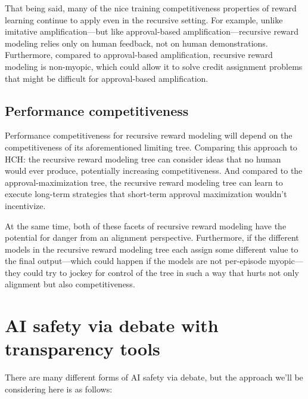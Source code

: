 \documentclass[
  onecolumn,
  natbib,
]{miri-tech-article}
\begin{document}
That being said, many of the nice training competitiveness properties of reward learning continue to apply even in the recursive setting. For example, unlike imitative amplification---but like approval-based amplification---recursive reward modeling relies only on human feedback, not on human demonstrations. Furthermore, compared to approval-based amplification, recursive reward modeling is non-myopic, which could allow it to solve credit assignment problems that might be difficult for approval-based amplification.

\subsection{Performance competitiveness} Performance competitiveness for recursive reward modeling will depend on the competitiveness of its aforementioned limiting tree. Comparing this approach to HCH: the recursive reward modeling tree can consider ideas that no human would ever produce, potentially increasing competitiveness. And compared to the approval-maximization tree, the recursive reward modeling tree can learn to execute long-term strategies that short-term approval maximization wouldn't incentivize.

At the same time, both of these facets of recursive reward modeling have the potential for danger from an alignment perspective. Furthermore, if the different models in the recursive reward modeling tree each assign some different value to the final output---which could happen if the models are not per-episode myopic---they could try to jockey for control of the tree in such a way that hurts not only alignment but also competitiveness.

\section{AI safety via debate with transparency tools}
\label{sec:9}

There are many different forms of AI safety via debate,\cite{debate} but the approach we'll be considering here is as follows:
\end{document}
